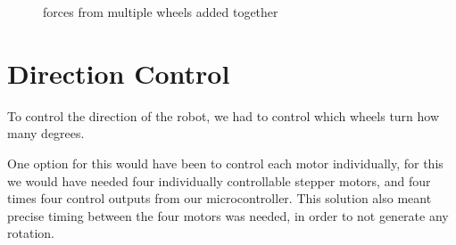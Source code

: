 \begin{figure}[htp]
	
  	\caption{forces from multiple wheels added together}
\end{figure}

\section{Direction Control}\label{sec:direction}
To control the direction of the robot,
we had to control which wheels turn how many degrees.

One option for this would have been to control each motor individually,
for this we would have needed four individually controllable stepper motors,
and four times four control outputs from our microcontroller.
This solution also meant precise timing between the four motors was needed,
in order to not generate any rotation.

